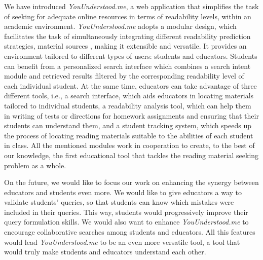 \documentclass{sig-alternate-05-2015}
\begin{document}
\noindent
We have introduced \textit{YouUnderstood.me}, a web application that simplifies the task of seeking for adequate online resources in terms of readability levels, within an academic environment. \textit{YouUnderstood.me} adopts a modular design, which facilitates the task of simultaneously integrating different readability prediction strategies, material sources
, making it extensible and versatile. It provides an environment tailored to different types of users: students and educators. Students can benefit from a personalized search interface which combines a search intent module and retrieved results filtered by the corresponding readability level %
of each individual student. At the same time, educators can take advantage of three different tools, i.e., a search interface, which aids educators in locating materials tailored to individual students, a readability analysis tool, which can help them in writing of tests or directions for homework assignments and ensuring that their students can understand them, and a student tracking system,  which speeds up the process of locating reading materials suitable to the abilities of each student in class. All the mentioned modules work in cooperation to create, to the best of our knowledge, the first educational tool that tackles the reading material seeking problem as a whole.

On the future, we would like to focus our work on enhancing the synergy between educators and students even more. We would like to give educators a way to validate students' queries, so that students can know which mistakes were included in their queries. This way, students would progressively improve their query formulation skills. We would also want to enhance \textit{YouUnderstood.me} to encourage collaborative searches among students and educators.  All this features would lead \textit{YouUnderstood.me} to be an even more versatile tool, a tool that would truly make students and educators understand each other.








\end{document}
